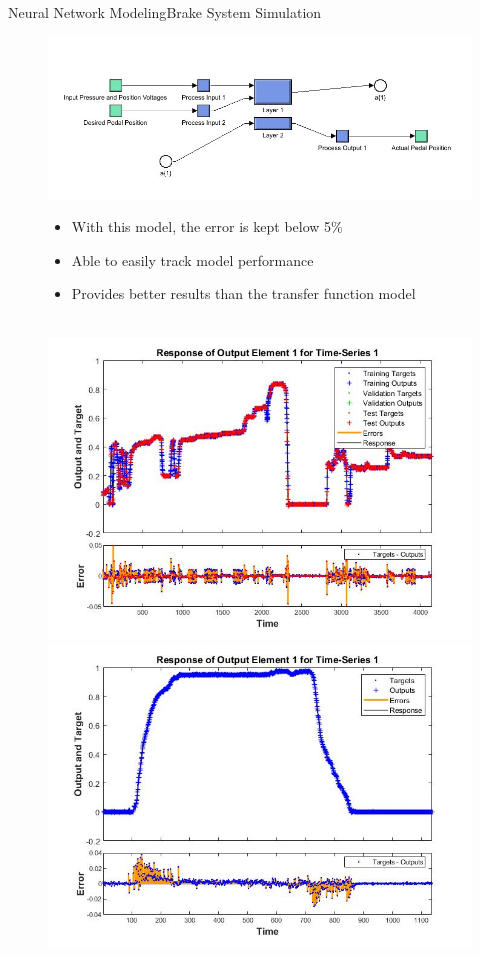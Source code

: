 \documentclass{beamer}
\begin{document}
\begin{frame}{Neural Network Modeling}{Brake System Simulation}
	\begin{block}{}
\begin{figure}[H]
  			\centering \includegraphics[width=.48\linewidth , height=.37\textheight]{figs/img/brakeSimulinkBlock}\quad%
			\centering \begin{minipage}[b][0.4\textheight][c]{.45\linewidth}  \begin{itemize}
			\item With this model, the error is kept below 5\%
			\item Able to easily track model performance
			\item Provides better results than the transfer function model
			\end{itemize} \end{minipage}\\[1em]
			\centering \includegraphics[width=.45\linewidth , height=.37\textheight]{figs/img/brake_new_neuralNetworkFig.jpg}\quad%
			\centering \includegraphics[width=.45\linewidth , height=.37\textheight]{figs/img/brake_new_neuralNetworkFigLog2Test.jpg}
  		\end{figure}
	
  \end{block}
\end{frame}
\end{document}
